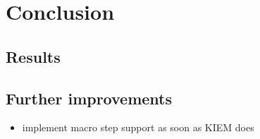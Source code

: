 \chapter{Conclusion}
\label{chapter:AutoConclusion}
\section{Results}

\section{Further improvements}
\begin{itemize}
 \item implement macro step support as soon as KIEM does
\end{itemize}
